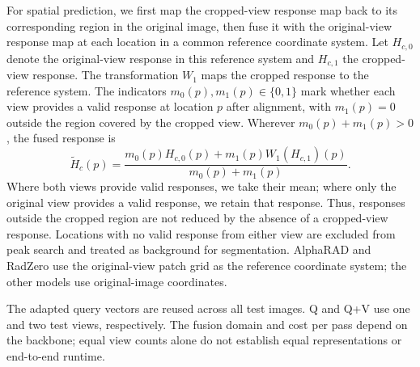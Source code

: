 For spatial prediction, we first map the cropped-view response map back to its corresponding region in the original image, then fuse it with the original-view response map at each location in a common reference coordinate system. Let $H_{c,0}$ denote the original-view response in this reference system and $H_{c,1}$ the cropped-view response. The transformation $W_1$ maps the cropped response to the reference system. The indicators $m_0(p),m_1(p)\in\{0,1\}$ mark whether each view provides a valid response at location $p$ after alignment, with $m_1(p)=0$ outside the region covered by the cropped view. Wherever $m_0(p)+m_1(p)>0$, the fused response is
\begin{equation}
\widetilde H_c(p)=
\frac{m_0(p)H_{c,0}(p)+m_1(p)W_1(H_{c,1})(p)}{m_0(p)+m_1(p)}.
\label{eq:supp-spatial-fusion}
\end{equation}
Where both views provide valid responses, we take their mean; where only the original view provides a valid response, we retain that response. Thus, responses outside the cropped region are not reduced by the absence of a cropped-view response. Locations with no valid response from either view are excluded from peak search and treated as background for segmentation. AlphaRAD and RadZero use the original-view patch grid as the reference coordinate system; the other models use original-image coordinates.

The adapted query vectors are reused across all test images. Q and Q+V use one and two test views, respectively. The fusion domain and cost per pass depend on the backbone; equal view counts alone do not establish equal representations or end-to-end runtime.
